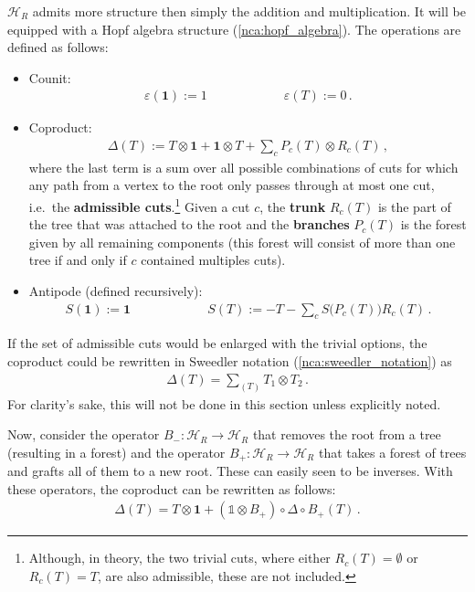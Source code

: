     $\mathcal{H}_R$ admits more structure then simply the addition and multiplication. It will be equipped with a Hopf algebra structure (\cref{nca:hopf_algebra}). The operations are defined as follows:
    \begin{itemize}
        \item Counit:
        \begin{gather}
            \label{qft:connes_kreimer_counit}
            \varepsilon(\symbf{1}):=1 \qquad\qquad\qquad \varepsilon(T):=0\,.
        \end{gather}
        \item Coproduct:
        \begin{gather}
            \Delta(T) := T\otimes\symbf{1}+\symbf{1}\otimes T+\sum_cP_c(T)\otimes R_c(T)\,,
        \end{gather}
        where the last term is a sum over all possible combinations of cuts for which any path from a vertex to the root only passes through at most one cut, i.e.~the \textbf{admissible cuts}.\footnote{Although, in theory, the two trivial cuts, where either $R_c(T)=\emptyset$ or $R_c(T)=T$, are also admissible, these are not included.} Given a cut $c$, the \textbf{trunk} $R_c(T)$ is the part of the tree that was attached to the root and the \textbf{branches} $P_c(T)$ is the forest given by all remaining components (this forest will consist of more than one tree if and only if $c$ contained multiples cuts).
        \item Antipode (defined recursively):
        \begin{gather}
            \label{qft:antipode}
            S(\symbf{1}) := \symbf{1} \qquad\qquad\qquad S(T) := -T-\sum_cS\bigl(P_c(T)\bigr)R_c(T)\,.
        \end{gather}
    \end{itemize}

    \begin{remark}\label{qft:sweedler_notation}
        If the set of admissible cuts would be enlarged with the trivial options, the coproduct could be rewritten in Sweedler notation (\cref{nca:sweedler_notation}) as
        \begin{gather}
            \Delta(T) = \sum_{(T)}T_1\otimes T_2\,.
        \end{gather}
        For clarity's sake, this will not be done in this section unless explicitly noted.
    \end{remark}

    Now, consider the operator $B_-:\mathcal{H}_R\rightarrow\mathcal{H}_R$ that removes the root from a tree (resulting in a forest) and the operator $B_+:\mathcal{H}_R\rightarrow\mathcal{H}_R$ that takes a forest of trees and grafts all of them to a new root. These can easily seen to be inverses. With these operators, the coproduct can be rewritten as follows:
    \begin{gather}
        \Delta(T) = T\otimes\symbf{1} + (\mathbb{1}\otimes B_+)\circ\Delta\circ B_+(T)\,.
    \end{gather}

